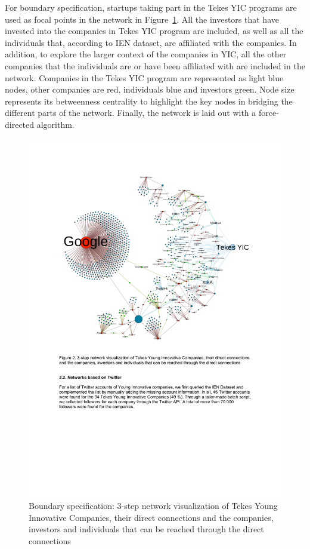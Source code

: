For boundary specification, startups taking part in the Tekes YIC programs are used as focal points in the network in Figure~\ref{fig:tekes-yic-3-step}. All the investors that have invested into the companies in Tekes YIC program are included, as well as all the individuals that, according to IEN dataset, are affiliated with the companies. In addition, to explore the larger context of the companies in YIC, all the other companies that the individuals are or have been affiliated with are included in the network. Companies in the Tekes YIC program are represented as light blue nodes, other companies are red, individuals blue and investors green. Node size represents its betweenness centrality to highlight the key nodes in bridging the different parts of the network. Finally, the network is laid out with a force-directed algorithm.

\begin{figure}[htb]
\centering
\includegraphics[width=12cm]{figure/Tekes-YIC-3-step.pdf}
\caption{Boundary specification: 3-step network visualization of Tekes Young Innovative Companies, their direct connections and the companies, investors and individuals that can be reached through the direct connections
 \citep{Huhtamaki2012NetworksFinland}}
\label{fig:tekes-yic-3-step}
\end{figure}

